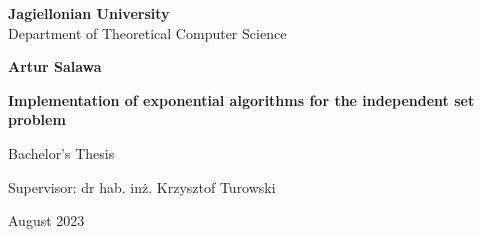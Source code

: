 \begin{titlepage}
	\begin{center}
        
		\large
		\textbf{Jagiellonian University}\\
		Department of Theoretical Computer Science\\

		\vspace{1.5cm}

		\Large
		\textbf{Artur Salawa}

		\vspace*{2cm}

		\textbf{\LARGE Implementation of exponential algorithms for the independent set  problem}
		
		\vspace{0.5cm}
		\large
		
		\vfill
		\Large
		Bachelor's Thesis

		\vfill
		\Large
		Supervisor: dr hab. in\.z. Krzysztof Turowski
		
		\vspace{0.8cm}
		
		August 2023
		
\end{center}
\end{titlepage}